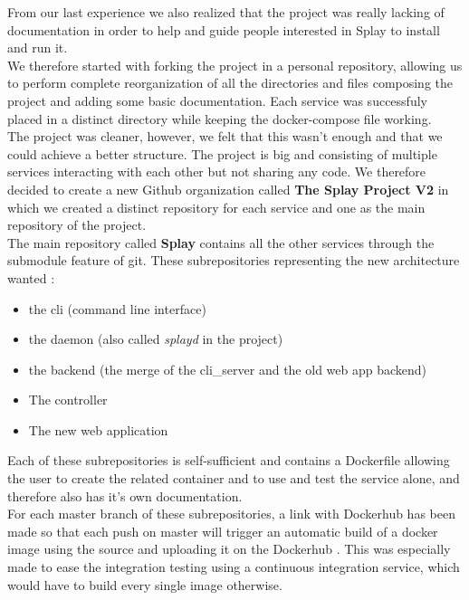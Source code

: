 \documentclass{eplmastersthesis}
\begin{document}
        From our last experience we also realized that the project was really
        lacking of documentation in order to help and guide people interested
        in Splay to install and run it.\\

        We therefore started with forking the project in a personal repository,
        allowing us to perform complete reorganization of all the directories
        and files composing the project and adding some basic documentation.
        Each service was successfuly placed in a distinct directory while
        keeping the docker-compose file working.\\
        The project was cleaner, however, we felt that this wasn't enough
        and that we could achieve a better structure. The project is big and
        consisting of multiple services interacting with each other but
        not sharing any code. We therefore decided to create a new Github
        organization called \textbf{The Splay Project V2} in which we created
        a distinct repository for each service and one as the main repository
        of the project.\\

        The main repository called \textbf{Splay} contains all the other services
        through the submodule \cite{GitSubmodules} feature of git. These
        subrepositories representing the new architecture wanted :

        \begin{itemize}
          \item the cli (command line interface)
          \item the daemon (also called \textit{splayd} in the project)
          \item the backend (the merge of the cli\_server and the old web app backend)
          \item The controller
          \item The new web application
        \end{itemize}

        Each of these subrepositories is self-sufficient and contains a Dockerfile
        allowing the user to create the related container and to use and test
        the service alone, and therefore also has it's own documentation.\\

        For each master branch of these subrepositories, a link with Dockerhub
        has been made so that each push on master will trigger an automatic build
        of a docker image using the source and uploading it on the Dockerhub \cite{DockerHubGithub}.
        This was especially made to ease the integration testing using a
        continuous integration service, which would have to build every single
        image otherwise.\\
\end{document}
